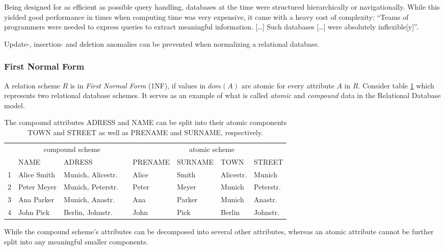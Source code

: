 Being designed for as efficient as possible query handling, databases at the time were structured hierarchically or navigationally.
While this yielded good performance in times when computing time was very expensive, it came with a heavy cost of complexity:
``Teams of programmers were needed to express queries to extract meaningful information. [\dots] Such databases [\dots] were absolutely inflexible[y]''.\cite{IBM03}

Update-, insertion- and deletion anomalies can be prevented when normalizing a relational database. \cite[p.~75]{KLE11}

\subsubsection{First Normal Form}
A relation scheme $R$ is in \emph{First Normal Form} (1NF), if values in \(dom(A)\) are atomic for every attribute \(A\) in \(R\). \cite[p.~96]{MAI83}
Consider table \ref{tab:first-normal-form} which represents two relational database schemes.
It serves as an example of what is called \emph{atomic} and \emph{compound} data in the Relational Database model. \cite[p.~6]{COD90}

\begin{table}[ht]
    \centering
    \begin{tabular}{@{}rlllllll@{}}\toprule
    & \multicolumn{3}{c}{compound scheme} & \phantom{abc}& \multicolumn{2}{c}{atomic scheme} \\
    \cmidrule{2-3} \cmidrule{5-8}
    & NAME & ADRESS && PRENAME & SURNAME & TOWN & STREET   \\ \midrule
    1 & Alice Smith & Munich, Alicestr. && Alice & Smith & Alicestr. & Munich \\
2 &  Peter Meyer & Munich, Peterstr. && Peter & Meyer & Munich & Peterstr. \\
3 & Ana Parker & Munich, Anastr. && Ana & Parker & Munich & Anastr. \\
4 & John Pick & Berlin, Johnstr. && John & Pick & Berlin & Johnstr. \\
\bottomrule
\end{tabular}
\caption{The compound attributes ADRESS and NAME can be split into their atomic components TOWN and STREET as well as PRENAME and SURNAME, respectively.}
\label{tab:first-normal-form}
\end{table}
While the compound scheme's attributes can be decomposed into several other attributes, whereas an atomic attribute cannot be further split into any meaningful smaller components.\\


